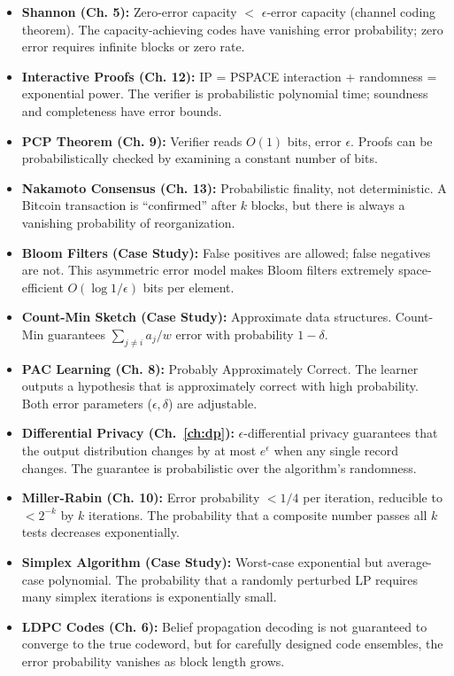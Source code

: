 \begin{itemize}
\item \textbf{Shannon (Ch. 5):} Zero-error capacity $<$ $\epsilon$-error capacity (channel coding theorem). The capacity-achieving codes have vanishing error probability; zero error requires infinite blocks or zero rate.

\item \textbf{Interactive Proofs (Ch. 12):} IP = PSPACE interaction + randomness = exponential power. The verifier is probabilistic polynomial time; soundness and completeness have error bounds.

\item \textbf{PCP Theorem (Ch. 9):} Verifier reads $O(1)$ bits, error $\epsilon$. Proofs can be probabilistically checked by examining a constant number of bits.

\item \textbf{Nakamoto Consensus (Ch. 13):} Probabilistic finality, not deterministic. A Bitcoin transaction is ``confirmed'' after $k$ blocks, but there is always a vanishing probability of reorganization.

\item \textbf{Bloom Filters (Case Study):} False positives are allowed; false negatives are not. This asymmetric error model makes Bloom filters extremely space-efficient $O(\log 1/\epsilon)$ bits per element.

\item \textbf{Count-Min Sketch (Case Study):} Approximate data structures. Count-Min guarantees $\sum_{j \neq i} a_j / w$ error with probability $1 - \delta$.

\item \textbf{PAC Learning (Ch. 8):} Probably Approximately Correct. The learner outputs a hypothesis that is approximately correct with high probability. Both error parameters ($\epsilon, \delta$) are adjustable.

\item \textbf{Differential Privacy (Ch.~\ref{ch:dp}):} $\epsilon$-differential privacy guarantees that the output distribution changes by at most $e^\epsilon$ when any single record changes. The guarantee is probabilistic over the algorithm's randomness.

\item \textbf{Miller-Rabin (Ch. 10):} Error probability $< 1/4$ per iteration, reducible to $< 2^{-k}$ by $k$ iterations. The probability that a composite number passes all $k$ tests decreases exponentially.

\item \textbf{Simplex Algorithm (Case Study):} Worst-case exponential but average-case polynomial. The probability that a randomly perturbed LP requires many simplex iterations is exponentially small.

\item \textbf{LDPC Codes (Ch. 6):} Belief propagation decoding is not guaranteed to converge to the true codeword, but for carefully designed code ensembles, the error probability vanishes as block length grows.
\end{itemize}

